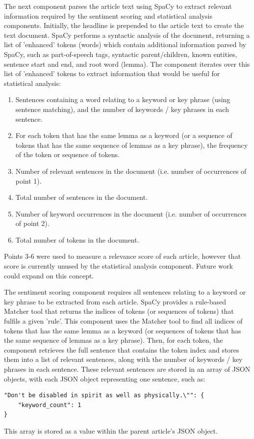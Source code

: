 \documentclass{report}
\begin{document}
The next component parses the article text using SpaCy \cite{SpaCy} to extract relevant information required by the sentiment scoring and statistical analysis components.
Initially, the headline is prepended to the article text to create the text document.
SpaCy performs a syntactic analysis of the document, returning a list of 'enhanced' tokens (words) which contain additional information parsed by SpaCy, such as part-of-speech tags, syntactic parent/children, known entities, sentence start and end, and root word (lemma).
The component iterates over this list of 'enhanced' tokens to extract information that would be useful for statistical analysis:
\begin{enumerate}
	\item Sentences containing a word relating to a keyword or key phrase (using sentence matching), and the number of keywords / key phrases in each sentence.
	\item For each token that has the same lemma as a keyword (or a sequence of tokens that has the same sequence of lemmas as a key phrase), the frequency of the token or sequence of tokens.
	\item Number of relevant sentences in the document (i.e. number of occurrences of point 1).
	\item Total number of sentences in the document.
	\item Number of keyword occurrences in the document (i.e. number of occurrences of point 2).
	\item Total number of tokens in the document.
\end{enumerate}
Points 3-6 were used to measure a relevance score of each article, however that score is currently unused by the statistical analysis component. 
Future work could expand on this concept.

The sentiment scoring component requires all sentences relating to a keyword or key phrase to be extracted from each article.
SpaCy provides a rule-based Matcher tool that returns the indices of tokens (or sequences of tokens) that fulfils a given 'rule'.
This component uses the Matcher tool to find all indices of tokens that has the same lemma as a keyword (or sequences of tokens that has the same sequence of lemmas as a key phrase).
Then, for each token, the component retrieves the full sentence that contains the token index and stores them into a list of relevant sentences, along with the number of keywords / key phrases in each sentence.
These relevant sentences are stored in an array of JSON objects, with each JSON object representing one sentence, such as:
\begin{lstlisting}
"Don't be disabled in spirit as well as physically.\"": {
	"keyword_count": 1
}
\end{lstlisting}
This array is stored as a value within the parent article's JSON object.
\end{document}
